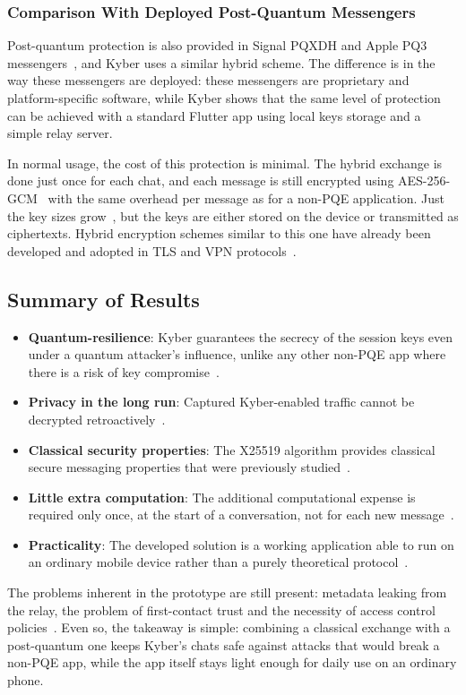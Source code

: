 \subsubsection{Comparison With Deployed Post-Quantum Messengers}

Post-quantum protection is also provided in Signal PQXDH and Apple PQ3 messengers~\cite{pqxdh,pq3}, and Kyber uses a similar hybrid scheme. The difference is in the way these messengers are deployed: these messengers are proprietary and platform-specific software, while Kyber shows that the same level of protection can be achieved with a standard Flutter app using local keys storage and a simple relay server.

In normal usage, the cost of this protection is minimal. The hybrid exchange is done just once for each chat, and each message is still encrypted using AES-256-GCM~\cite{gcm} with the same overhead per message as for a non-PQE application. Just the key sizes grow~\cite{fips203}, but the keys are either stored on the device or transmitted as ciphertexts. Hybrid encryption schemes similar to this one have already been developed and adopted in TLS and VPN protocols~\cite{ietf_hybrid_tls,ietf_hybrid_ike}.

\subsection{Summary of Results}

\begin{itemize}
    \item \textbf{Quantum-resilience}: Kyber guarantees the secrecy of the session keys even under a quantum attacker's influence, unlike any other non-PQE app where there is a risk of key compromise~\cite{shor,fips203}.
    
    \item \textbf{Privacy in the long run}: Captured Kyber-enabled traffic cannot be decrypted retroactively~\cite{bsi_hybrid}.
    
    \item \textbf{Classical security properties}: The X25519 algorithm provides classical secure messaging properties that were previously studied~\cite{doubleratchet,rfc7748}.
    
    \item \textbf{Little extra computation}: The additional computational expense is required only once, at the start of a conversation, not for each new message~\cite{gcm}.
    
    \item \textbf{Practicality}: The developed solution is a working application able to run on an ordinary mobile device rather than a purely theoretical protocol~\cite{pqxdh,pq3}.
\end{itemize}

The problems inherent in the prototype are still present: metadata leaking from the relay, the problem of first-contact trust and the necessity of access control policies~\cite{dolev_yao}. Even so, the takeaway is simple: combining a classical exchange with a post-quantum one keeps Kyber's chats safe against attacks that would break a non-PQE app, while the app itself stays light enough for daily use on an ordinary phone.
